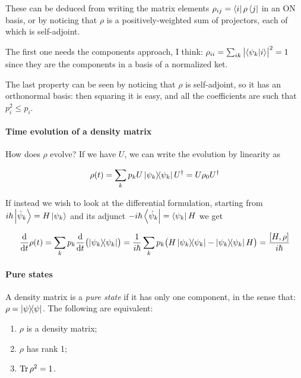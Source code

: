 \documentclass[main.tex]{subfiles}
\begin{document}
These can be deduced from writing the matrix elements \(\rho _{ij} = \bra{i} \rho \bra{j} \) in an ON basis, or by noticing that \(\rho \) is a positively-weighted sum of projectors, each of which is self-adjoint.

The first one needs the components approach, I think: \(\rho_{ii} = \sum _{ik}  \abs{\braket{\psi_k}{i} }^2 =1 \) since they are the components in a basis of a normalized ket.

The last property can be seen by noticing that \(\rho\) is self-adjoint, so it has an orthonormal basis: then squaring it is easy, and all the coefficients are such that \(p_i^2 \leq p_i\).

\paragraph{Time evolution of a density matrix}

How does \(\rho\) evolve? If we have \(U\), we can write the evolution by linearity as

\begin{equation}
    \rho(t) = \sum _{k} p_k  U\dyad{\psi_k}U^\dag =  U \rho_0 U^\dag
\end{equation}

If instead we wish to look at the differential formulation, starting from \(i \hbar \ket{\dot{\psi}_k} = H \ket{\psi_k}\) and its adjunct \(-i \hbar \bra{\dot{\psi}_k} =  \bra{\psi_k} H\) we get

\begin{equation}
    \dv{}{t} \rho(t) =  \sum _{k} p_k  \dv{}{t} \qty(\dyad{\psi_k})
    = \frac{1}{i \hbar} \sum _{k} p_k  \qty(H \dyad{\psi_k} - \dyad{\psi_k}H)
    = \frac{[H, \rho]}{i \hbar}
\end{equation}

\paragraph{Pure states}

A density matrix is a \emph{pure state} if it has only one component, in the sense that: \(\rho = \dyad{\psi} \). The following are equivalent:

\begin{enumerate}
    \item \(\rho \) is a density matrix;
    \item \(\rho\) has rank 1;
    \item \(\operatorname*{Tr} \rho^2 = 1\).
\end{enumerate}
\end{document}
